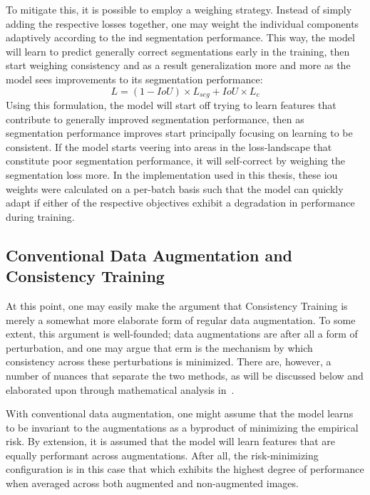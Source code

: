 To mitigate this, it is possible to employ a weighing strategy. Instead of simply adding the respective losses together, one may weight the individual components adaptively according to the \gls{ind} segmentation performance. This way, the model will learn to predict generally correct segmentations early in the training, then start weighing consistency and as a result generalization more and more as the model sees improvements to its segmentation performance:
    \begin{equation}
        L = (1-IoU)\times L_{seg} + IoU \times L_c
    \end{equation}
Using this formulation, the model will start off trying to learn features that contribute to generally improved segmentation performance, then as segmentation performance improves start principally focusing on learning to be consistent. If the model starts veering into areas in the loss-landscape that constitute poor segmentation performance, it will self-correct by weighing the segmentation loss more. In the implementation used in this thesis, these \gls{iou} weights were calculated on a per-batch basis such that the model can quickly adapt if either of the respective objectives exhibit a degradation in performance during training. 

\subsection{Conventional Data Augmentation and Consistency Training}\label{cons_vs_aug}
    At this point, one may easily make the argument that Consistency Training is merely a somewhat more elaborate form of regular data augmentation. To some extent, this argument is well-founded; data augmentations are after all a form of perturbation, and one may argue that \gls{erm} is the mechanism by which consistency across these perturbations is minimized. There are, however, a number of nuances that separate the two methods, as will be discussed below and elaborated upon through mathematical analysis in~. 
    
    With conventional data augmentation, one might assume that the model learns to be invariant to the augmentations as a byproduct of minimizing the empirical risk. By extension, it is assumed that the model will learn features that are equally performant across augmentations. After all, the risk-minimizing configuration is in this case that which exhibits the highest degree of performance when averaged across both augmented and non-augmented images. 
    
